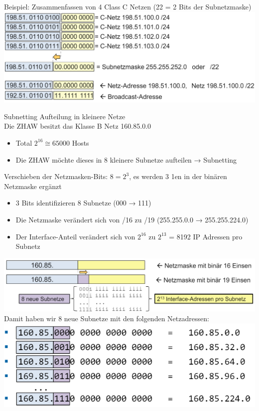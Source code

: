 \begin{example}
    Beispiel: Zusammenfassen von 4 Class C Netzen (22 = 2 Bits der Subnetzmaske)\\
        \includegraphics[width=1\linewidth]{images/example_supernetting.png}
\end{example}

\begin{concept}{Subnetting}
    Aufteilung in kleinere Netze\\
    Die ZHAW besitzt das Klasse B Netz 160.85.0.0
    \begin{itemize}
        \item Total $2^{16} \cong 65000$  Hosts
        \item Die ZHAW möchte dieses in 8 kleinere Subnetze aufteilen → Subnetting
    \end{itemize}
    Verschieben der Netzmasken-Bits: $8 = 2^3$, es werden 3 1en in der binären Netzmaske ergänzt
    \begin{itemize}
        \item 3 Bits identifizieren 8 Subnetze (000 → 111)
        \item Die Netzmaske verändert sich von /16 zu /19 (255.255.0.0 → 255.255.224.0)
        \item Der Interface-Anteil verändert sich von $2^{16}$ zu $2^{13}$ = 8192 IP Adressen pro Subnetz
    \end{itemize}
        \includegraphics[width=1\linewidth]{images/subnetting1.png}\\
    Damit haben wir 8 neue Subnetze mit den folgenden Netzadressen:\\
        \includegraphics[width=0.75\linewidth]{images/subnetting2.png}

\end{concept}
